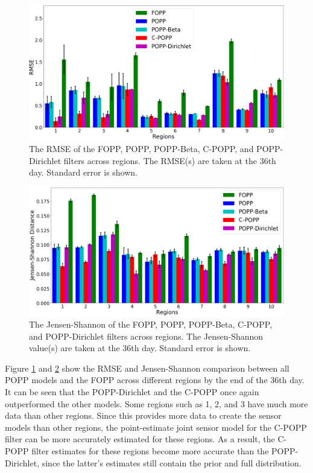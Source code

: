 \begin{figure}[t!]
	\centering
	\includegraphics[width=0.95\columnwidth]{./figures/fopp_popp_popb_npop_popd_rmse.png}
	\caption{The RMSE of the FOPP, POPP, POPP-Beta, C-POPP, and POPP-Dirichlet filters across regions. The RMSE(s) are taken at the 36th day. Standard error is shown.}
	\label{fig:fopp_popp_popb_npop_popd_rmse}
\end{figure}

\begin{figure}[t!]
	\centering
	\includegraphics[width=0.95\columnwidth]{./figures/fopp_popp_popb_npop_popd_kl.png}
	\caption{The Jensen-Shannon of the FOPP, POPP, POPP-Beta, C-POPP, and POPP-Dirichlet filters across regions. The Jensen-Shannon value(s) are taken at the 36th day. Standard error is shown.}
	\label{fig:fopp_popp_popb_npop_popd_kl}
\end{figure}


Figure \ref{fig:fopp_popp_popb_npop_popd_rmse} and \ref{fig:fopp_popp_popb_npop_popd_kl} show the RMSE and Jensen-Shannon comparison between all POPP models and the FOPP across different regions by the end of the 36th day. It can be seen that the POPP-Dirichlet and the C-POPP once again outperformed the other models. Some regions such as 1, 2, and 3 have much more data than other regions. Since this  provides  more data to create the sensor models than other regions, the point-estimate joint sensor model for the C-POPP filter can be more accurately estimated for these regions. As a result, the C-POPP filter estimates for these regions become more accurate than the POPP-Dirichlet, since the latter's estimates still contain the prior and full distribution. 


